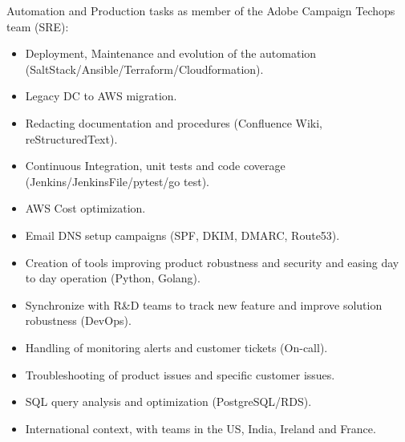 \documentclass[10pt,a4paper,sans]{moderncv}        %
\begin{document}
        {}
        {}
        {}
        {Automation and Production tasks as member of the Adobe Campaign Techops team (SRE):
        \begin{itemize}
        \item Deployment, Maintenance and evolution of the automation (SaltStack/Ansible/Terraform/Cloudformation).
        \item Legacy DC to AWS migration.
        \item Redacting documentation and procedures (Confluence Wiki, reStructuredText).
        \item Continuous Integration, unit tests and code coverage (Jenkins/JenkinsFile/pytest/go test).
        \item AWS Cost optimization.
		\item Email DNS setup campaigns (SPF, DKIM, DMARC, Route53).
        \item Creation of tools improving product robustness and security and easing day to day operation (Python, Golang).
        \item Synchronize with R\&D teams to track new feature and improve solution robustness (DevOps).
		\item Handling of monitoring alerts and customer tickets (On-call).
        \item Troubleshooting of product issues and specific customer issues.
        \item SQL query analysis and optimization (PostgreSQL/RDS).
		\item International context, with teams in the US, India, Ireland and France.
        \end{itemize}
        }
\end{document}
